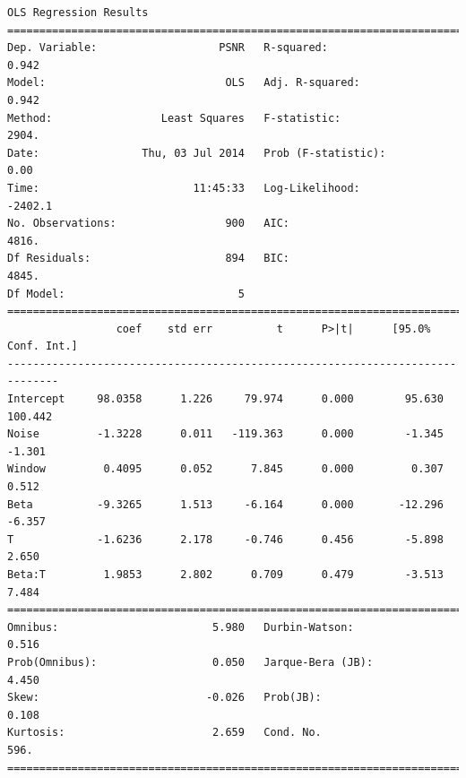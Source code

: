 \documentclass[11pt]{article}
\theoremstyle{definition}
\begin{document}
{\begin{lstlisting}[caption = Time Series 3 - Non-Local Means OLS Model, label = {nlmeansfilterseries3}]
                            OLS Regression Results                            
==============================================================================
Dep. Variable:                   PSNR   R-squared:                       0.942
Model:                            OLS   Adj. R-squared:                  0.942
Method:                 Least Squares   F-statistic:                     2904.
Date:                Thu, 03 Jul 2014   Prob (F-statistic):               0.00
Time:                        11:45:33   Log-Likelihood:                -2402.1
No. Observations:                 900   AIC:                             4816.
Df Residuals:                     894   BIC:                             4845.
Df Model:                           5                                         
==============================================================================
                 coef    std err          t      P>|t|      [95.0% Conf. Int.]
------------------------------------------------------------------------------
Intercept     98.0358      1.226     79.974      0.000        95.630   100.442
Noise         -1.3228      0.011   -119.363      0.000        -1.345    -1.301
Window         0.4095      0.052      7.845      0.000         0.307     0.512
Beta          -9.3265      1.513     -6.164      0.000       -12.296    -6.357
T             -1.6236      2.178     -0.746      0.456        -5.898     2.650
Beta:T         1.9853      2.802      0.709      0.479        -3.513     7.484
==============================================================================
Omnibus:                        5.980   Durbin-Watson:                   0.516
Prob(Omnibus):                  0.050   Jarque-Bera (JB):                4.450
Skew:                          -0.026   Prob(JB):                        0.108
Kurtosis:                       2.659   Cond. No.                         596.
==============================================================================
\end{lstlisting}

}
\end{document}
